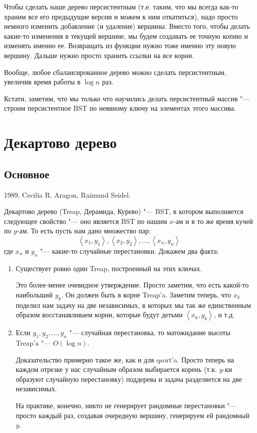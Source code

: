 Чтобы сделать наше дерево персистентным (т.е. таким, что мы всегда как-то храним все его предыдущие версии и можем к ним откатиться),
надо просто немного изменить добавление (и удаление) вершины.
Вместо того, чтобы делать какие-то изменения в текущей вершине, мы будем создавать ее точную копию и изменять именно ее.
Возвращать из функции нужно тоже именно эту новую вершину.
Дальше нужно просто хранить ссылки на все корни.

Вообще, любое сбалансированное дерево можно сделать персистентным, увеличив время работы в $\log n$ раз.

Кстати, заметим, что мы только что научились делать персистентный массив "--- строим персистентное BST по неявному ключу
на элементах этого массива.

\section{Декартово дерево}

\subsection{Основное}

1989, Cecilia R. Aragon, Raimund Seidel.

Декартово дерево (Treap, Дерамида, Курево) "--- BST, в котором выполняется следующее свойство "--- оно является BST по нашим $x$-ам
и в то же время кучей по $y$-ам.
То есть пусть нам дано множество пар:
\[ \left<x_1, y_1\right>, \left<x_2, y_2\right>, \dots, \left<x_n, y_n\right> \]
где $x_n$ и $y_n$ "--- какие-то случайные перестановки. Докажем два факта:
\begin{enumerate}
\item
	Существует ровно один Treap, построенный на этих ключах.

	Это более-менее очевидное утверждение.
	Просто заметим, что есть какой-то наибольший $y_k$. Он должен быть в корне Treap'a.
	Заметим теперь, что $x_k$ поделил нам задачу на две независимых, в которых
	мы так же единственным образом восстанавливаем корни, которые будут
	детьми $\left<x_k, y_k\right>$, и т.д.

\item
	Если $y_1, y_2, ..., y_n$ "--- случайная перестановка, то матожидание высоты Treap'a "--- $O(\log n)$.

	Доказательство примерно такое же, как и для qsort'a.
	Просто теперь на каждом отрезке у нас случайным образом выбирается корень
	(т.к. $y$-ки образуют случайную перестановку) поддерева и задача разделяется на две независимых.

	На практике, конечно, никто не генерирует рандомные перестановки "--- просто каждый раз,
	создавая очередную вершину, генерируем ей рандомный $y$.
\end{enumerate}

